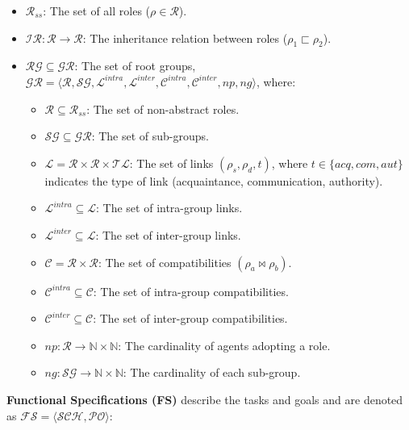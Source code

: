 \documentclass[conference]{IEEEtran}
\newcounter{relation}
\begin{document}
\begin{itemize}
    \item $\mathcal{R}_{ss}$: The set of all roles ($\rho \in \mathcal{R}$).
    \item $\mathcal{IR}: \mathcal{R} \rightarrow \mathcal{R}$: The inheritance relation between roles ($\rho_1 \sqsubset \rho_2$).
    \item $\mathcal{RG} \subseteq \mathcal{GR}$: The set of root groups, $\mathcal{GR} = \langle \mathcal{R}, \mathcal{SG}, \mathcal{L}^{intra}, \mathcal{L}^{inter}, \mathcal{C}^{intra}, \mathcal{C}^{inter}, np, ng \rangle$, where:
    \begin{itemize}
        \item $\mathcal{R} \subseteq \mathcal{R}_{ss}$: The set of non-abstract roles.
        \item $\mathcal{SG} \subseteq \mathcal{GR}$: The set of sub-groups.
        \item $\mathcal{L} = \mathcal{R} \times \mathcal{R} \times \mathcal{TL}$: The set of links $(\rho_s, \rho_d, t)$, where $t \in \{acq, com, aut\}$ indicates the type of link (acquaintance, communication, authority).
        \item $\mathcal{L}^{intra} \subseteq \mathcal{L}$: The set of intra-group links.
        \item $\mathcal{L}^{inter} \subseteq \mathcal{L}$: The set of inter-group links.
        \item $\mathcal{C} = \mathcal{R} \times \mathcal{R}$: The set of compatibilities $(\rho_a \bowtie \rho_b)$.
        \item $\mathcal{C}^{intra} \subseteq \mathcal{C}$: The set of intra-group compatibilities.
        \item $\mathcal{C}^{inter} \subseteq \mathcal{C}$: The set of inter-group compatibilities.
        \item $np: \mathcal{R} \rightarrow \mathbb{N} \times \mathbb{N}$: The cardinality of agents adopting a role.
        \item $ng: \mathcal{SG} \rightarrow \mathbb{N} \times \mathbb{N}$: The cardinality of each sub-group.
    \end{itemize}
\end{itemize}

\textbf{Functional Specifications (FS)} describe the tasks and goals and are denoted as $\mathcal{FS} = \langle \mathcal{SCH}, \mathcal{PO} \rangle$:
\end{document}
